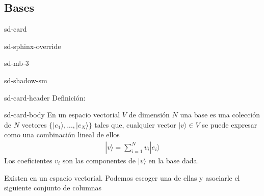 \documentclass[letterpaper,10pt,english]{jupyterBook}
\newcommand{\ket}[1]{|#1\rangle}
\begin{document}
\subsection{Bases}
\label{\detokenize{docs/Part_01_Formalismo/Chapter_01_02_Formalismo_matem_xe1tico/01_02_Vectores_myst:bases}}
\begin{sphinxuseclass}{sd-card}
\begin{sphinxuseclass}{sd-sphinx-override}
\begin{sphinxuseclass}{sd-mb-3}
\begin{sphinxuseclass}{sd-shadow-sm}
\begin{sphinxuseclass}{sd-card-header}
\sphinxAtStartPar
Definición:

\end{sphinxuseclass}
\begin{sphinxuseclass}{sd-card-body}
\sphinxAtStartPar
En un espacio vectorial \(V\) de dimensión \(N\) una base es una colección de \(N\) vectores  \(\{\ket{e_1},...,\ket{e_N}\}\) tales que, cualquier vector \(\ket{v}\in V\) se puede expresar como una combinación lineal de ellos
\begin{equation*}
\begin{split}
\ket{v} = \sum_{i=1}^N v_i \ket{e_i}
\end{split}
\end{equation*}
\sphinxAtStartPar
Los coeficientes \(v_i\) son las componentes de \(\ket{v}\) en la base dada.

\end{sphinxuseclass}
\end{sphinxuseclass}
\end{sphinxuseclass}
\end{sphinxuseclass}
\end{sphinxuseclass}
\sphinxAtStartPar
Existen  en un espacio vectorial. Podemos escoger una de ellas y asociarle el siguiente conjunto de columnas
\end{document}
